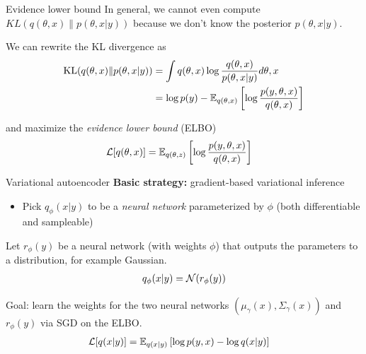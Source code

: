 \documentclass[10pt, compress]{beamer}
\begin{document}
\begin{frame}{Evidence lower bound}
  In general, we cannot even compute $KL(q(\theta, x)\|p(\theta, x | y))$
  because
  we don't know the posterior $p(\theta, x | y)$.

  \pause
  We can rewrite the KL divergence as
  \begin{align*}
    \textrm{KL}(q(\theta, x)\|p(\theta, x|y)) &= \int q(\theta, x)\log\frac{q(\theta, x)}{p(\theta, x | y)}d\theta, x \\
              &= \log p(y) - \mathbb{E}_{q(\theta, x)}\left[\log\frac{p(y, \theta, x)}{q(\theta, x)}\right]
  \end{align*}

  \pause
  and maximize the \emph{evidence lower bound} (ELBO)
  \begin{align*}
    \mathcal{L}[q(\theta, x)] &= \mathbb{E}_{q(\theta, z)}\left[\log\frac{p(y, \theta, x)}{q(\theta, x)}\right]
  \end{align*}
\end{frame}
\begin{frame}{Variational autoencoder}
  \textbf{Basic strategy:} gradient-based variational inference

  \pause

  \begin{itemize}
    \item Pick $q_\phi(x | y)$ to be a \emph{neural network} parameterized by $\phi$ (both differentiable and sampleable)
  \end{itemize}

  \pause
  Let $r_\phi(y)$ be a neural network (with weights $\phi$)
  that outputs the parameters to a distribution, for example Gaussian.
  \begin{align*}
    q_\phi(x | y) = \mathcal{N}(r_\phi(y))
  \end{align*}

  \pause

  \pause
  Goal: learn the weights for the two neural networks $(\mu_\gamma(x), \Sigma_\gamma(x))$ and $r_\phi(y)$
  via SGD on the ELBO.
  \pause
  \begin{align*}
    \mathcal{L}[q(x | y)] &= \mathbb{E}_{q(x | y)}\left[\log p(y, x) - \log q(x | y)\right]
  \end{align*}
\end{frame}
\end{document}
